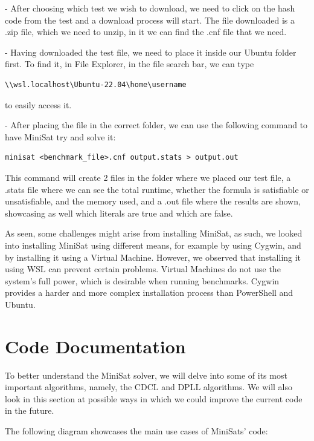 \documentclass[runningheads]{llncs}
\begin{document}
- After choosing which test we wish to download, we need to click on the hash code from the test and a download process will start. The file downloaded is a .zip file, which we need to unzip, in it we can find the .cnf file that we need.

- Having downloaded the test file, we need to place it inside our Ubuntu folder first. To find it, in File Explorer, in the file search bar, we can type \begin{verbatim}\\wsl.localhost\Ubuntu-22.04\home\username\end{verbatim} to easily access it. 

- After placing the file in the correct folder, we can use the following command to have MiniSat try and solve it: 
\begin{verbatim}minisat <benchmark_file>.cnf output.stats > output.out\end{verbatim}

This command will create 2 files in the folder where we placed our test file, a .stats file where we can see the total runtime, whether the formula is satisfiable or unsatisfiable, and the memory used, and a .out file where the results are shown, showcasing as well which literals are true and which are false.

As seen, some challenges might arise from installing MiniSat, as such, we looked into installing MiniSat using different means, for example by using Cygwin, and by installing it using a Virtual Machine. However, we observed that installing it using \ac{WSL} can prevent certain problems. Virtual Machines do not use the system's full power, which is desirable when running benchmarks. Cygwin provides a harder and more complex installation process than PowerShell and Ubuntu.

\section{Code Documentation}\label{cap:Code Documentation}

To better understand the MiniSat solver, we will delve into some of its most important algorithms, namely, the \ac{CDCL} and \ac{DPLL} algorithms. We will also look in this section at possible ways in which we could improve the current code in the future.

The following diagram showcases the main use cases of MiniSats' code:
\end{document}
